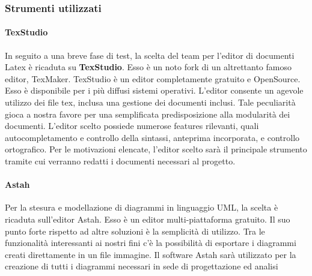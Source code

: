 \subsubsection{Strumenti utilizzati}

\paragraph{TexStudio}
In seguito a una breve fase di test, la scelta del team per l'editor di documenti Latex è ricaduta su \textbf{TexStudio}. Esso è un noto fork di un altrettanto famoso editor, TexMaker. TexStudio è un editor completamente gratuito e OpenSource. Esso è disponibile per i più diffusi sistemi operativi. L'editor consente un agevole utilizzo dei file tex, inclusa una gestione dei documenti inclusi. Tale peculiarità gioca a nostra favore per una semplificata predisposizione alla modularità dei documenti. L'editor scelto possiede numerose features rilevanti, quali autocompletamento e controllo della sintassi, anteprima incorporata, e controllo ortografico. Per le motivazioni elencate, l'editor scelto sarà il principale strumento tramite cui verranno redatti i documenti necessari al progetto.

\paragraph{Astah}
Per la stesura e modellazione di diagrammi in linguaggio UML, la scelta è ricaduta sull'editor Astah. Esso è un editor multi-piattaforma gratuito. Il suo punto forte rispetto ad altre soluzioni è la semplicità di utilizzo. Tra le funzionalità interessanti ai nostri fini c'è la possibilità di esportare i diagrammi creati direttamente in un file immagine. Il software Astah sarà utilizzato per la creazione di tutti i diagrammi necessari in sede di progettazione ed analisi
